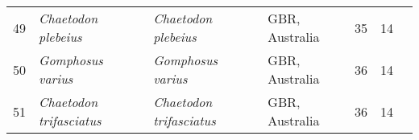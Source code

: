 \begin{table}[ht]
\begin{center}
{\begin{tabular}{rlllrrl}
   49 & \textit{Chaetodon plebeius} & \textit{Chaetodon plebeius} & GBR, Australia &  35 &  14 & \citep{sweatman2008} \\
   50 & \textit{Gomphosus varius} & \textit{Gomphosus varius} & GBR, Australia &  36 &  14 & \citep{sweatman2008} \\
   51 & \textit{Chaetodon trifasciatus} & \textit{Chaetodon trifasciatus} & GBR, Australia &  36 &  14 & \citep{sweatman2008} \\
   \bottomrule
\end{tabular}
}
\end{center}
\end{table}
